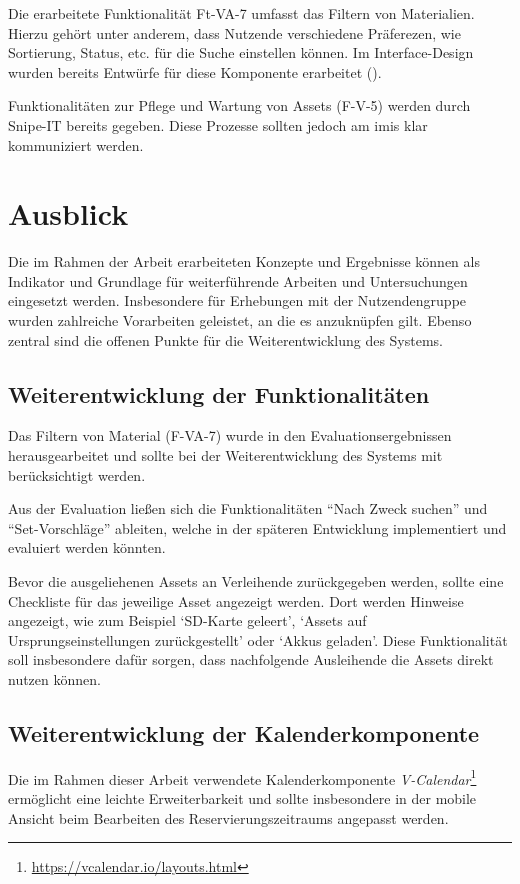 Die erarbeitete Funktionalität Ft-VA-7 umfasst das Filtern von Materialien. Hierzu gehört unter
anderem, dass Nutzende verschiedene Präferezen, wie Sortierung, Status, etc. für die Suche
einstellen können. Im Interface-Design wurden bereits Entwürfe für diese Komponente erarbeitet
(\label{appendix:digitaleMedien}).

Funktionalitäten zur Pflege und Wartung von Assets (F-V-5) werden durch Snipe-IT bereits gegeben.
Diese Prozesse sollten jedoch am \ac{imis} klar kommuniziert werden.


\section{Ausblick}
Die im Rahmen der Arbeit erarbeiteten Konzepte und Ergebnisse können als Indikator und Grundlage für
weiterführende Arbeiten und Untersuchungen eingesetzt werden. Insbesondere für Erhebungen mit der
Nutzendengruppe wurden zahlreiche Vorarbeiten geleistet, an die es anzuknüpfen gilt. Ebenso zentral
sind die offenen Punkte für die Weiterentwicklung des Systems.

\subsection{Weiterentwicklung der Funktionalitäten}
Das Filtern von Material (F-VA-7) wurde in den Evaluationsergebnissen
herausgearbeitet und sollte bei der Weiterentwicklung des Systems mit
berücksichtigt werden.

Aus der Evaluation ließen sich die Funktionalitäten \enquote{Nach Zweck suchen}
und \enquote{Set-Vorschläge} ableiten, welche in der späteren Entwicklung
implementiert und evaluiert werden könnten.

Bevor die ausgeliehenen Assets an Verleihende zurückgegeben werden, sollte eine
Checkliste für das jeweilige Asset angezeigt  werden. Dort werden Hinweise angezeigt,
wie zum Beispiel \enquote*{SD-Karte geleert}, \enquote*{Assets auf Ursprungseinstellungen
zurückgestellt} oder \enquote*{Akkus geladen}. Diese Funktionalität soll insbesondere dafür
sorgen, dass nachfolgende Ausleihende die Assets direkt nutzen können.

\subsection{Weiterentwicklung der Kalenderkomponente}
Die im Rahmen dieser Arbeit verwendete Kalenderkomponente
\textit{V-Calendar}\footnote{\url{https://vcalendar.io/layouts.html}} ermöglicht
eine leichte Erweiterbarkeit und sollte insbesondere in der mobile Ansicht beim
Bearbeiten des Reservierungszeitraums angepasst werden.

